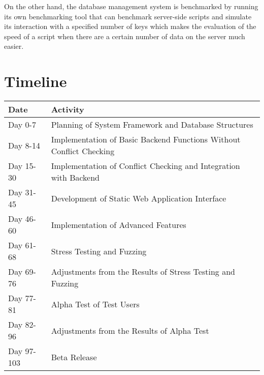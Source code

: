\documentclass{sigchi}
\begin{document}
On the other hand, the database management system is benchmarked by running its own benchmarking tool
that can benchmark server-side scripts and simulate its interaction with a specified number of keys which
makes the evaluation of the speed of a script when there are a certain number of data on the server much easier.

\section{Timeline}
\begin{center}
    \begin{tabular}[!htbp]{ | l | p{5cm} |}
    \hline
      Date & Activity \\ \hline
      Day 0-7 & Planning of System Framework and Database Structures \\ \hline
      Day 8-14 & Implementation of Basic Backend Functions Without Conflict Checking \\ \hline
      Day 15-30 & Implementation of Conflict Checking and Integration with Backend \\ \hline
      Day 31-45 & Development of Static Web Application Interface \\ \hline
      Day 46-60 & Implementation of Advanced Features \\ \hline
      Day 61-68 & Stress Testing and Fuzzing \\ \hline
      Day 69-76 & Adjustments from the Results of Stress Testing and Fuzzing \\ \hline
      Day 77-81 & Alpha Test of Test Users \\ \hline
      Day 82-96 & Adjustments from the Results of Alpha Test \\ \hline
      Day 97-103 & Beta Release \\ \hline
    \end{tabular}
\end{center}
\end{document}
